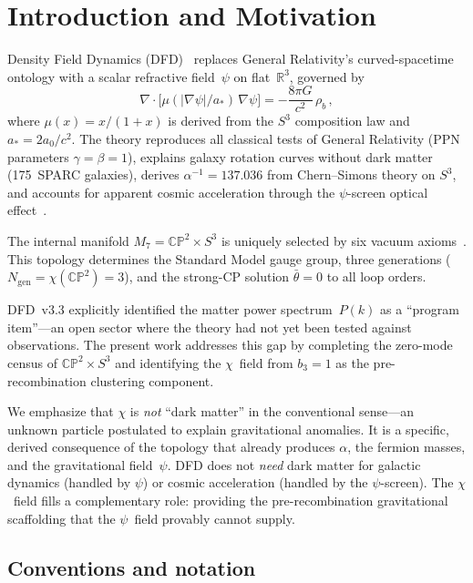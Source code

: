 \documentclass[aps,prd,twocolumn,superscriptaddress,showpacs,floatfix,nofootinbib]{revtex4-2}
\theoremstyle{definition}
\theoremstyle{remark}
\newcommand{\CP}{\mathbb{CP}}
\newcommand{\Sph}{S}
\newcommand{\astar}{a_*}
\newcommand{\azero}{a_0}
\newcommand{\Ngen}{N_{\mathrm{gen}}}
\begin{document}
\section{Introduction and Motivation}
\label{sec:intro}

Density Field Dynamics (DFD)~\cite{Alcock2025} replaces
General Relativity's curved-spacetime ontology with a scalar
refractive field~$\psi$ on flat~$\mathbb{R}^3$, governed by
\begin{equation}
\label{eq:psi-field}
\nabla\cdot\bigl[\mu(|\nabla\psi|/\astar)\,\nabla\psi\bigr]
= -\frac{8\pi G}{c^2}\,\rho_b\,,
\end{equation}
where $\mu(x)=x/(1+x)$ is derived from the $\Sph^3$
composition law and $\astar = 2\azero/c^2$. The theory
reproduces all classical tests of General Relativity
(PPN parameters $\gamma=\beta=1$), explains galaxy rotation
curves without dark matter (175~SPARC galaxies), derives
$\alpha^{-1}=137.036$ from Chern--Simons theory on $\Sph^3$,
and accounts for apparent cosmic acceleration through the
$\psi$-screen optical effect~\cite{Alcock2025}.

The internal manifold $M_7=\CP^2\times\Sph^3$ is uniquely
selected by six vacuum axioms~\cite{Alcock2025b}. This
topology determines the Standard Model gauge group, three
generations ($\Ngen=\chi(\CP^2)=3$), and the strong-CP
solution $\bar\theta=0$ to all loop orders.

DFD~v3.3 explicitly identified the matter power
spectrum~$P(k)$ as a ``program item''---an open sector
where the theory had not yet been tested against
observations. The present work addresses this gap by
completing the zero-mode census of $\CP^2\times\Sph^3$
and identifying the $\chi$~field from $b_3=1$ as the
pre-recombination clustering component.

We emphasize that $\chi$ is \emph{not} ``dark matter''
in the conventional sense---an unknown particle postulated
to explain gravitational anomalies. It is a specific,
derived consequence of the topology that already produces
$\alpha$, the fermion masses, and the gravitational
field~$\psi$. DFD does not \emph{need} dark matter for
galactic dynamics (handled by $\psi$) or cosmic
acceleration (handled by the $\psi$-screen). The $\chi$~field
fills a complementary role: providing the pre-recombination
gravitational scaffolding that the $\psi$~field provably
cannot supply.

\subsection{Conventions and notation}
\end{document}
